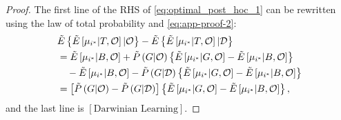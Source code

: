 \documentclass[12pt,english]{article}
\theoremstyle{plain}
\theoremstyle{plain}
\begin{document}
\begin{appendices}
\begin{proof}
    The first line of the RHS of \eqref{eq:optimal_post_hoc_1} can be rewritten using the law of total probability and \eqref{eq:app-proof-2}:
    \begin{align}    
    & \tilde{E}\left\{ \tilde{E}\left[\mu_{i^{\ast}}|T,\mathcal{O}\right]|\mathcal{O}\right\} 
      -\tilde{E}\left\{ \tilde{E}\left[\mu_{i^{\ast}}|T,\mathcal{O}\right]|\mathcal{D}\right\} \notag \\
    &= \tilde{E}\left[\mu_{i^{\ast}}|B,\mathcal{O}\right]
       + \tilde{P}\left(G|\mathcal{O}\right) 
         \left\{ \tilde{E}\left[\mu_{i^{\ast}}|G,\mathcal{O}\right]
         -\tilde{E}\left[\mu_{i^{\ast}}|B,\mathcal{O}\right]\right\} \notag \\
    &\quad -\tilde{E}\left[\mu_{i^{\ast}}|B,\mathcal{O}\right]
           -\tilde{P}\left(G|\mathcal{D}\right) 
           \left\{ 
            \tilde{E}\left[\mu_{i^{\ast}}|G,\mathcal{O}\right]
            -\tilde{E}\left[\mu_{i^{\ast}}|B,\mathcal{O}\right]
            \right\} \notag \\
    &= \left[\tilde{P}\left(G|\mathcal{O}\right)-\tilde{P}\left(G|\mathcal{D}\right)\right]
        \left\{ \tilde{E}\left[\mu_{i^{\ast}}|G,\mathcal{O}\right]
               -\tilde{E}\left[\mu_{i^{\ast}}|B,\mathcal{O}\right]\right\} 
       , \label{eq:optimal_post_hoc_2}
    \end{align}
    and the last line is $\left[\text{Darwinian Learning}\right]$.
\end{proof}

\end{appendices}

\printbibliography
\end{document}
